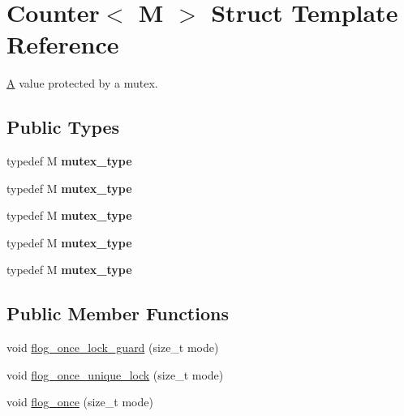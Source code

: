 \hypertarget{structCounter}{}\section{Counter$<$ M $>$ Struct Template Reference}
\label{structCounter}


\hyperlink{structA}{A} value protected by a mutex.  


\subsection*{Public Types}
\begin{DoxyCompactItemize}
\item 
\hypertarget{structCounter_a8f78d02040d1b403ee1b544fab6c9ea3}{}typedef M {\bfseries mutex\+\_\+type}\label{structCounter_a8f78d02040d1b403ee1b544fab6c9ea3}

\item 
\hypertarget{structCounter_a8f78d02040d1b403ee1b544fab6c9ea3}{}typedef M {\bfseries mutex\+\_\+type}\label{structCounter_a8f78d02040d1b403ee1b544fab6c9ea3}

\item 
\hypertarget{structCounter_a8f78d02040d1b403ee1b544fab6c9ea3}{}typedef M {\bfseries mutex\+\_\+type}\label{structCounter_a8f78d02040d1b403ee1b544fab6c9ea3}

\item 
\hypertarget{structCounter_a8f78d02040d1b403ee1b544fab6c9ea3}{}typedef M {\bfseries mutex\+\_\+type}\label{structCounter_a8f78d02040d1b403ee1b544fab6c9ea3}

\item 
\hypertarget{structCounter_a8f78d02040d1b403ee1b544fab6c9ea3}{}typedef M {\bfseries mutex\+\_\+type}\label{structCounter_a8f78d02040d1b403ee1b544fab6c9ea3}

\end{DoxyCompactItemize}
\subsection*{Public Member Functions}
\begin{DoxyCompactItemize}
\item 
void \hyperlink{structCounter_a6f8c32d6c07de0c05189226b3b74bd4b}{flog\+\_\+once\+\_\+lock\+\_\+guard} (size\+\_\+t mode)
\item 
void \hyperlink{structCounter_a443739e1f5a443e8bb0af3186c3b36c7}{flog\+\_\+once\+\_\+unique\+\_\+lock} (size\+\_\+t mode)
\item 
void \hyperlink{structCounter_acd749201eda6beff5ce1bb4c94881530}{flog\+\_\+once} (size\+\_\+t mode)
\end{DoxyCompactItemize}
